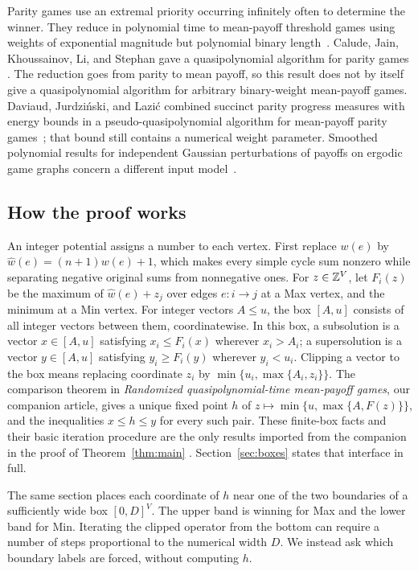Parity games use an extremal priority occurring infinitely often to
determine the winner. They reduce in polynomial time to mean-payoff
threshold games using weights of exponential magnitude but polynomial
binary length~\cite[Section~3]{Jurdzinski1998}. Calude, Jain,
Khoussainov, Li, and Stephan gave
a quasipolynomial algorithm for parity games
\cite{CaludeJainKhoussainovLiStephan2022}. The reduction goes from
parity to mean payoff, so this result does not by itself give a
quasipolynomial algorithm for arbitrary binary-weight mean-payoff games.
Daviaud, Jurdzi\'nski, and Lazi\'c combined succinct parity progress
measures with energy bounds in a pseudo-quasipolynomial algorithm for
mean-payoff parity games~\cite{DaviaudJurdzinskiLazic2018}; that
bound still contains a numerical weight parameter. Smoothed polynomial
results for independent Gaussian perturbations of payoffs on ergodic
game graphs concern a different input model~\cite{LoffSkomra2024}.

\subsection{How the proof works}

An integer potential assigns a number to each vertex. First replace
$w(e)$ by $\widehat w(e)=(n+1)w(e)+1$, which makes every simple
cycle sum nonzero while separating negative original sums from
nonnegative ones. For $z\in\mathbb Z^V$, let $F_i(z)$ be the maximum
of $\widehat w(e)+z_j$ over edges $e:i\to j$ at a Max vertex,
and the minimum at a Min vertex. For integer vectors $A\le u$,
the box $[A,u]$ consists of all integer vectors between them,
coordinatewise. In this box,
a subsolution is a vector $x\in[A,u]$ satisfying $x_i\le F_i(x)$
wherever $x_i>A_i$; a supersolution is a vector $y\in[A,u]$
satisfying $y_i\ge F_i(y)$ wherever $y_i<u_i$.
Clipping a vector to the box means replacing coordinate $z_i$ by
$\min\{u_i,\max\{A_i,z_i\}\}$. The comparison theorem in
\emph{Randomized quasipolynomial-time mean-payoff games}, our
companion article, gives a unique fixed point $h$ of $z\mapsto\min\{u,\max\{A,F(z)\}\}$,
and the inequalities $x\le h\le y$ for every such pair. These
finite-box facts and their basic iteration procedure are the only
results imported from the companion in the proof of
Theorem~\ref{thm:main}
\cite[Definition~2.2 and Lemmas~2.3--2.4]{OpenAI2026Randomized}.
Section~\ref{sec:boxes} states that interface in full.

The same section places each coordinate of $h$ near one of the
two boundaries of a sufficiently wide box $[0,D]^V$. The upper band
is winning for Max and the lower band for Min. Iterating the clipped
operator from the bottom can require a number of steps proportional
to the numerical width $D$. We instead ask which boundary labels are
forced, without computing $h$.

